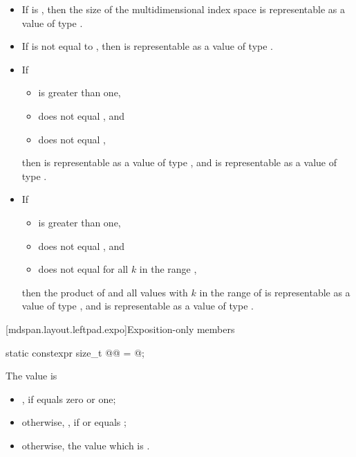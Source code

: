 \pnum
\mandates
\begin{itemize}
\item
If  is ,
then the size of the multidimensional index space 
is representable as a value of type .
\item
If  is not equal to , then
 is representable as a value of type .
\item
If
\begin{itemize}
\item
{} is greater than one,
\item
{} does not equal , and
\item
{} does not equal ,
\end{itemize}
then 
is representable as a val\-ue of type , and
is representable as a value of type .
\item
If
\begin{itemize}
\item
{} is greater than one,
\item
{} does not equal , and
\item
{} does not equal 
for all $k$ in the range ,
\end{itemize}
then the product of
 and
all values 
with $k$ in the range of 
is representable as a value of type , and
is representable as a value of type .
\end{itemize}

[mdspan.layout.leftpad.expo]{Exposition-only members}

\begin{itemdecl}
static constexpr size_t @@ = @\seebelow@;
\end{itemdecl}

\begin{itemdescr}
\pnum
The value is
\begin{itemize}
\item
{}, if  equals zero or one;
\item
otherwise, ,
if  or  equals
;
\item
otherwise, the  value which is
.
\end{itemize}
\end{itemdescr}

